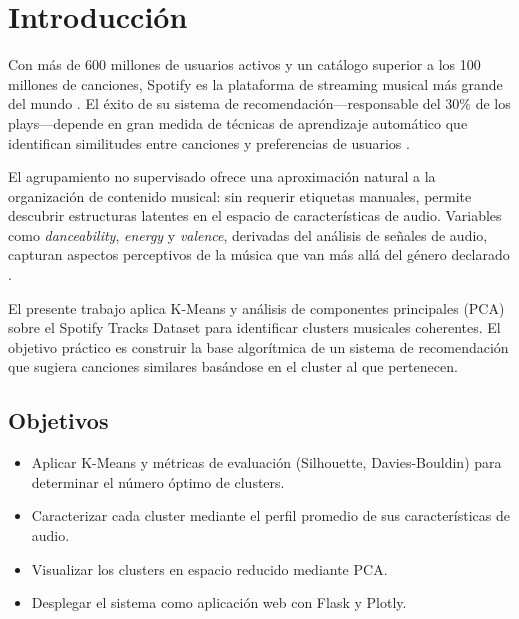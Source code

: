 \section{Introducción}

Con más de 600 millones de usuarios activos y un catálogo superior a los
100 millones de canciones, Spotify es la plataforma de streaming musical
más grande del mundo \cite{spotify2024stats}. El éxito de su sistema de
recomendación---responsable del 30\% de los plays---depende en gran medida
de técnicas de aprendizaje automático que identifican similitudes entre
canciones y preferencias de usuarios \cite{schedl2018current}.

El agrupamiento no supervisado ofrece una aproximación natural a la
organización de contenido musical: sin requerir etiquetas manuales,
permite descubrir estructuras latentes en el espacio de características
de audio. Variables como \textit{danceability}, \textit{energy} y
\textit{valence}, derivadas del análisis de señales de audio, capturan
aspectos perceptivos de la música que van más allá del género declarado
\cite{turnbull2008semantic}.

El presente trabajo aplica K-Means y análisis de componentes principales
(PCA) sobre el Spotify Tracks Dataset para identificar clusters musicales
coherentes. El objetivo práctico es construir la base algorítmica de un
sistema de recomendación que sugiera canciones similares basándose en
el cluster al que pertenecen.

\subsection{Objetivos}
\begin{itemize}
  \item Aplicar K-Means y métricas de evaluación (Silhouette, Davies-Bouldin)
        para determinar el número óptimo de clusters.
  \item Caracterizar cada cluster mediante el perfil promedio de sus
        características de audio.
  \item Visualizar los clusters en espacio reducido mediante PCA.
  \item Desplegar el sistema como aplicación web con Flask y Plotly.
\end{itemize}
